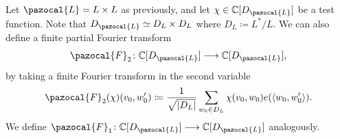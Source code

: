 \documentclass[a4paper,11pt]{amsart} %
\newcommand{\8}{\infty}
\newcommand{\four}{\pazocal{F}}
\newcommand{\R}{\mathbb{R}}
\newcommand{\C}{\mathbb{C}}
\newcommand{\Scal}{\pazocal{S}}
\newcommand{\Lcal}{\pazocal{L}}
\theoremstyle{mytheoremstyle}
\theoremstyle{remark}
\numberwithin{equation}{section}
\begin{document}
%

Let $\Lcal=L \times L$ as previously, and let $\chi\in \C[D_\Lcal]$ be a test function. Note that $D_\Lcal \simeq  D_L \times D_L$ where $D_L\coloneqq L^\ast/L$. We can also define a finite partial Fourier transform 
\begin{align}
\four_2 \colon \C[D_\Lcal] \longrightarrow \C[D_\Lcal],
\end{align}
by taking a finite Fourier transform in the second variable
\begin{align}
\four_2(\chi)(v_0,w_0') \coloneqq \frac{1}{\sqrt{\vert D_L \vert }} \sum_{w_0 \in D_L} \chi(v_0,w_0)e(\langle w_0,w_0' \rangle).
\end{align}
We define $\four_1 \colon \C[D_\Lcal] \longrightarrow \C[D_\Lcal]$ analogously. 
\end{document}
